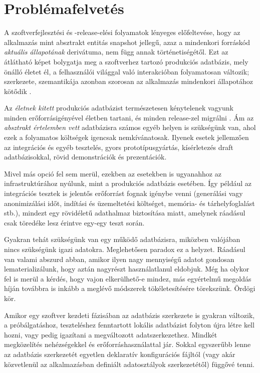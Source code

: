 \documentclass[
    parspace,
    noindent,
    nohyp,
]{elteiktdk}[2023/04/10]
\begin{document}
\section{Problémafelvetés}

A szoftverfejlesztési és -release-elési folyamatok lényeges előfeltevése,
hogy az alkalmazás mint absztrakt entitás snapshot jellegű,
azaz a mindenkori forráskód \textit{aktuális állapotának} derivátuma,
nem függ annak történetiségétől.
Ezt az átlátható képet bolygatja meg a szoftverhez tartozó produkciós adatbázis,
mely önálló életet él, a felhasználói világgal való interakcióban folyamatosan változik;
szerkezete, szemantikája azonban szorosan az alkalmazás mindenkori állapotához kötődik%
\cite{Ploski2007DatabaseCentricVersioning,Fluri2023DatabaseCiCd,Edwards2023LiveLocalSchemaChange}.

Az \textit{életnek kitett} produkciós adatbázist természetesen kénytelenek vagyunk
minden erőforrásigényével életben tartani, és minden release-zel migrálni%
\cite{SoftwareFlyway,SoftwareLiquibase}.
Ám az \textit{absztrakt értelemben vett} adatbázisra számos egyéb helyen is szükségünk van,
ahol ezek a folyamatos költségek igencsak nemkívánatosak.
Ilyenek esetek jellemzően az integrációs és egyéb tesztelés, gyors prototípusgyártás,
kísérletezés draft adatbázisokkal, rövid demonstrációk és prezentációk.

Mivel más opció fel sem merül, ezekben az esetekben is ugyanahhoz az infrastruktúrához nyúlunk,
mint a produkciós adatbázis esetében.
Így például az integrációs tesztek is jelentős erőforrást fognak igénybe venni
(generálási vagy anonimizálási időt, indítási  és üzemeltetési költséget, memória- és tárhelyfoglalást stb.),
mindezt egy rövidéletű adathalmaz biztosítása miatt,
amelynek ráadásul csak töredéke lesz érintve egy-egy teszt során.

Gyakran tehát szükségünk van egy működő adatbázisra,
miközben valójában nincs szükségünk igazi adatokra.
Meglehetősen paradox ez a helyzet.
Ráadásul van valami abszurd abban, amikor ilyen nagy mennyiségű adatot
gondosan lematerializálunk, hogy aztán nagyrészt használatlanul eldobjuk.
Még ha olykor fel is merül a kérdés, hogy vajon elkerülhető-e mindez,
más egyértelmű megoldás híján továbbra is inkább a meglévő módszerek tökéletesítésére törekszünk.
Ördögi kör.

Amikor egy szoftver kezdeti fázisában az adatbázis szerkezete is gyakran változik,
a próbálgatáshoz, teszteléshez fenntartott lokális adatbázist folyton újra létre kell hozni,
vagy pedig igazítani a megváltozott adatszerkezethez.
Mindkét megközelítés nehézségekkel és erőforráshasználattal jár.
Sokkal egyszerűbb lenne az adatbázis szerkezetét egyetlen deklaratív konfigurációs fájltól
(vagy akár közvetlenül az alkalmazásban definiált adatosztályok szerkezetétől) függővé tenni.
\end{document}
